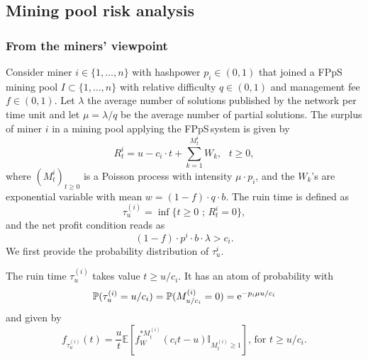 \subsection{Mining pool risk analysis}\label{ssec:mining_pool_risk_analysis}


\subsubsection{From the miners' viewpoint}\label{sssec:miner_viewpoint}
Consider miner $i\in \{1,\ldots, n\}$ with hashpower $p_i\in(0,1)$ that joined a FPpS mining pool $I\subset\{1,\ldots, n\}$ with relative difficulty $q\in(0,1)$ and management fee $f\in(0,1)$. Let $\lambda$ the average number of solutions published by the network per time unit and let $\mu = \lambda/q$ be the average number of partial solutions. The surplus of miner $i$ in a mining pool applying the FPpS\,system is given by
\begin{equation*}
R_t^i = u - c_i\cdot t + \sum_{k = 1}^{M^i_t}W_k,\text{ }t\geq0,
\end{equation*}
where $(M^i_t)_{t\geq0}$ is a Poisson process with intensity $\mu \cdot p_i$, and the $W_k$'s are \iid exponential variable with mean $w = (1-f)\cdot q\cdot b$. The ruin time is defined as 
$$
\tau_u^{(i)} = \inf\{t\geq0\text{ ; } R_t^i = 0\},
$$
and the net profit condition reads as 
$$
(1-f)\cdot p^{i}\cdot b\cdot \lambda>c_i.
$$
We first provide the probability distribution of $\tau_u^{i}$.
\begin{theo}\label{theo:pdf_ruin_time_miner_in_pool}
The ruin time $\tau_u^{(i)}$ takes value $t\geq u/c_i$. It has an atom of probability with 
\[
\mathbb{P}(\tau_u^{(i)} = u/c_i) = \mathbb{P}(M^{(i)}_{u/c_i}=0)=\mathrm{e}^{-p_i\mu u/c_i}
\]
and \pdf given by 
\begin{equation}\label{eq:pdf_ruin_time_miner_in_pool}
f_{\tau_u^{(i)}}(t)=\frac{u}{t}\mathbb{E}\left[f_{W}^{\ast M_t^{(i)}}(c_i t-u)\mathbb{I}_{M^{(i)}_t \geq1}\right]\text{, for }t\geq u/c_i.
\end{equation}
\end{theo}
